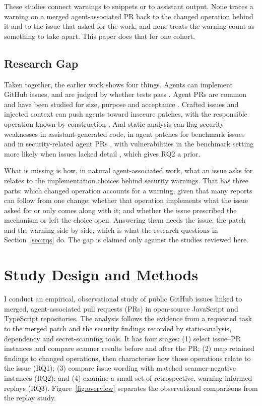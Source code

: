 \documentclass[acmsmall,screen,nonacm]{acmart}
\begin{document}
These studies connect warnings to snippets or to assistant output. None traces a warning on a merged agent-associated PR back to the changed operation behind it and to the issue that asked for the work, and none treats the warning count as something to take apart. This paper does that for one cohort.

\subsection{Research Gap}

Taken together, the earlier work shows four things. Agents can implement GitHub issues, and are judged by whether tests pass \cite{b9,b20,b22,b25}. Agent PRs are common and have been studied for size, purpose and acceptance \cite{b11,b21}. Crafted issues and injected context can push agents toward insecure patches, with the responsible operation known by construction \cite{b3,b16,b6,b12,b24}. And static analysis can flag security weaknesses in assistant-generated code, in agent patches for benchmark issues and in security-related agent PRs \cite{b32,b35,b36,b37}, with vulnerabilities in the benchmark setting more likely when issues lacked detail \cite{b36}, which gives RQ2 a prior.

What is missing is how, in natural agent-associated work, what an issue asks for relates to the implementation choices behind security warnings. That has three parts: which changed operation accounts for a warning, given that many reports can follow from one change; whether that operation implements what the issue asked for or only comes along with it; and whether the issue prescribed the mechanism or left the choice open. Answering them needs the issue, the patch and the warning side by side, which is what the research questions in Section~\ref{sec:rqs} do. The gap is claimed only against the studies reviewed here.

\section{Study Design and Methods}

I conduct an empirical, observational study of public GitHub issues linked to merged, agent-associated pull requests (PRs) in open-source JavaScript and TypeScript repositories. The analysis follows the evidence from a requested task to the merged patch and the security findings recorded by static-analysis, dependency and secret-scanning tools. It has four stages: (1) select issue--PR instances and compare scanner results before and after the PR; (2) map retained findings to changed operations, then characterise how those operations relate to the issue (RQ1); (3) compare issue wording with matched scanner-negative instances (RQ2); and (4) examine a small set of retrospective, warning-informed replays (RQ3). Figure~\ref{fig:overview} separates the observational comparisons from the replay study.
\end{document}
